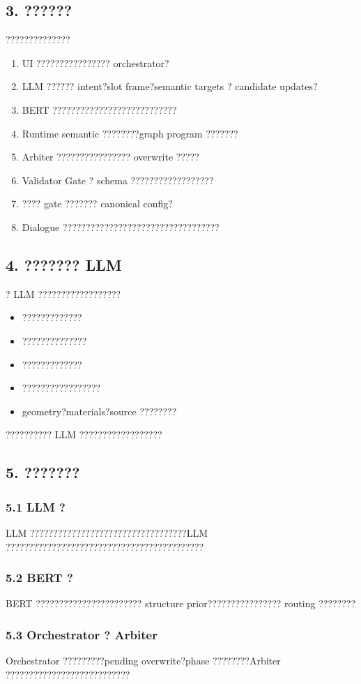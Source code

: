 \documentclass[11pt,a4paper]{ctexart}
\begin{document}
\subsection*{3. ??????}
??????????????
\begin{enumerate}
\item UI ???????????????? orchestrator?
\item LLM ?????? intent?slot frame?semantic targets ? candidate updates?
\item BERT ???????????????????????????
\item Runtime semantic ????????graph program ???????
\item Arbiter ???????????????? overwrite ?????
\item Validator Gate ? schema ??????????????????
\item ???? gate ??????? canonical config?
\item Dialogue ??????????????????????????????????
\end{enumerate}
\subsection*{4. ??????? LLM}
? LLM ??????????????????
\begin{itemize}
\item ?????????????
\item ??????????????
\item ?????????????
\item ?????????????????
\item geometry?materials?source ????????
\end{itemize}
?????????? LLM ??????????????????
\subsection*{5. ???????}
\subsubsection*{5.1 LLM ?}
LLM ??????????????????????????????????LLM ???????????????????????????????????????????
\subsubsection*{5.2 BERT ?}
BERT ??????????????????????? structure prior???????????????? routing ????????
\subsubsection*{5.3 Orchestrator ? Arbiter}
Orchestrator ?????????pending overwrite?phase ????????Arbiter ???????????????????????????
\end{document}
